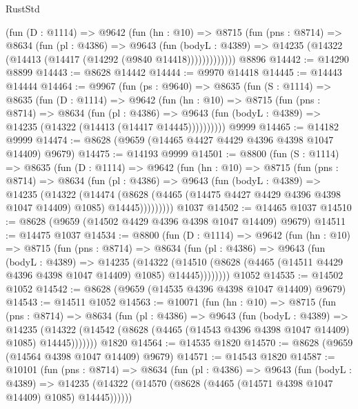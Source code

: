 \begin{lexlean}{RustStd}
\begin{coremodule}
          (fun (D : @1114) =>
          @9642
            (fun (hn : @10) =>
            @8715
              (fun (pns : @8714) =>
              @8634
                (fun (pl : @4386) =>
                @9643
                  (fun (bodyL : @4389) =>
                  @14235 (@14322 (@14413 (@14417 (@14292 (@9840 @14418)))))))))))))
    @8896
@14442 := @14290 @8899
@14443 := @8628 @14442
@14444 := @9970 @14418
@14445 := @14443 @14444
@14464 := @9967
    (fun (ps : @9640) =>
    @8635
      (fun (S : @1114) =>
      @8635
        (fun (D : @1114) =>
        @9642
          (fun (hn : @10) =>
          @8715
            (fun (pns : @8714) =>
            @8634
              (fun (pl : @4386) =>
              @9643 (fun (bodyL : @4389) => @14235 (@14322 (@14413 (@14417 @14445))))))))))
    @9999
@14465 := @14182 @9999
@14474 := @8628 (@9659 (@14465 @4427 @4429 @4396 @4398 @1047 @14409) @9679)
@14475 := @14193 @9999
@14501 := @8800
    (fun (S : @1114) =>
    @8635
      (fun (D : @1114) =>
      @9642
        (fun (hn : @10) =>
        @8715
          (fun (pns : @8714) =>
          @8634
            (fun (pl : @4386) =>
            @9643
              (fun (bodyL : @4389) =>
              @14235
                (@14322
                  (@14474
                    (@8628
                      (@4465 (@14475 @4427 @4429 @4396 @4398 @1047 @14409) @1085)
                      @14445)))))))))
    @1037
@14502 := @14465 @1037
@14510 := @8628 (@9659 (@14502 @4429 @4396 @4398 @1047 @14409) @9679)
@14511 := @14475 @1037
@14534 := @8800
    (fun (D : @1114) =>
    @9642
      (fun (hn : @10) =>
      @8715
        (fun (pns : @8714) =>
        @8634
          (fun (pl : @4386) =>
          @9643
            (fun (bodyL : @4389) =>
            @14235
              (@14322
                (@14510 (@8628 (@4465 (@14511 @4429 @4396 @4398 @1047 @14409) @1085) @14445))))))))
    @1052
@14535 := @14502 @1052
@14542 := @8628 (@9659 (@14535 @4396 @4398 @1047 @14409) @9679)
@14543 := @14511 @1052
@14563 := @10071
    (fun (hn : @10) =>
    @8715
      (fun (pns : @8714) =>
      @8634
        (fun (pl : @4386) =>
        @9643
          (fun (bodyL : @4389) =>
          @14235
            (@14322 (@14542 (@8628 (@4465 (@14543 @4396 @4398 @1047 @14409) @1085) @14445)))))))
    @1820
@14564 := @14535 @1820
@14570 := @8628 (@9659 (@14564 @4398 @1047 @14409) @9679)
@14571 := @14543 @1820
@14587 := @10101
    (fun (pns : @8714) =>
    @8634
      (fun (pl : @4386) =>
      @9643
        (fun (bodyL : @4389) =>
        @14235 (@14322 (@14570 (@8628 (@4465 (@14571 @4398 @1047 @14409) @1085) @14445))))))

\end{coremodule}
\end{lexlean}
